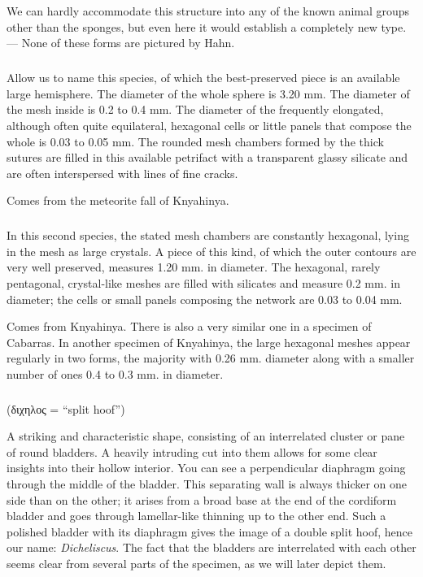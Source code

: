\documentclass[a4paper, 12pt, oneside]{article}
\begin{document}
We can hardly accommodate this structure into any of the known animal groups other than the sponges, but even here it would establish a completely new type. --- None of these forms are pictured by Hahn.
\paragraph{\large{}}
\subparagraph{}
Allow us to name this species, of which the best-preserved piece is an available large hemisphere. The diameter of the whole sphere is 3.20 mm. The diameter of the mesh inside is 0.2 to 0.4 mm. The diameter of the frequently elongated, although often quite equilateral, hexagonal cells or little panels that compose the whole is 0.03 to 0.05 mm. The rounded mesh chambers formed by the thick sutures are filled in this available petrifact with a transparent glassy silicate and are often interspersed with lines of fine cracks.

Comes from the meteorite fall of Knyahinya.
\paragraph{\large{}}
\subparagraph{}
In this second species, the stated mesh chambers are constantly hexagonal, lying in the mesh as large crystals. A piece of this kind, of which the outer contours are very well preserved, measures 1.20 mm. in diameter. The hexagonal, rarely pentagonal, crystal-like meshes are filled with silicates and measure 0.2 mm. in diameter; the cells or small panels composing the network are 0.03 to 0.04 mm.

Comes from Knyahinya. There is also a very similar one in a specimen of Cabarras. In another specimen of Knyahinya, the large hexagonal meshes appear regularly in two forms, the majority with 0.26 mm. diameter along with a smaller number of ones 0.4 to 0.3 mm. in diameter.
\subsubsection{}
\paragraph*{}
(διχηλος = ``split hoof'')%

A striking and characteristic shape, consisting of an interrelated cluster or pane of round bladders. A heavily intruding cut into them allows for some clear insights into their hollow interior. You can see a perpendicular diaphragm going through the middle of the bladder. This separating wall is always thicker on one side than on the other; it arises from a broad base at the end of the cordiform bladder and goes through lamellar-like thinning up to the other end. Such a polished bladder with its diaphragm gives the image of a double split hoof, hence our name: \emph{Dicheliscus}. The fact that the bladders are interrelated with each other seems clear from several parts of the specimen, as we will later depict them.
\end{document}

